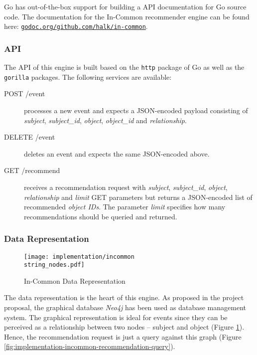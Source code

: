 Go has out-of-the-box support for building a API documentation for Go source code. The documentation for the In-Common recommender engine can be found here: \href{http://godoc.org/github.com/halk/in-common}{\texttt{godoc.org/github.com/halk/in-common}}.

\subsubsection{API}

The API of this engine is built based on the \texttt{http} package of Go as well as the \texttt{gorilla} packages. The following services are available:

\begin{description}
    \item[POST /event] processes a new event and expects a JSON-encoded payload consisting of \emph{subject}, \emph{subject_id}, \emph{object}, \emph{object_id} and \emph{relationship}.
    \item[DELETE /event] deletes an event and expects the same JSON-encoded above.
    \item[GET /recommend] receives a recommendation request with \emph{subject}, \emph{subject_id}, \emph{object}, \emph{relationship} and \emph{limit} GET parameters but returns a JSON-encoded list of recommended \emph{object IDs}. The parameter \emph{limit} specifies how many recommendations should be queried and returned.
\end{description}

\subsubsection{Data Representation}

\begin{figure}[ht]
    \texttt{[image: implementation/incommon\\string\_nodes.pdf]}
    \caption{In-Common Data Representation}
    \label{fig:implementation-incommon-nodes}
\end{figure}

The data representation is the heart of this engine. As proposed in the project proposal, the graphical database \emph{Neo4j} has been used as database management system. The graphical representation is ideal for events since they can be perceived as a relationship between two nodes -- subject and object (Figure \ref{fig:implementation-incommon-nodes}). Hence, the recommendation request is just a query against this graph (Figure \ref{fig:implementation-incommon-recommendation-query}).

